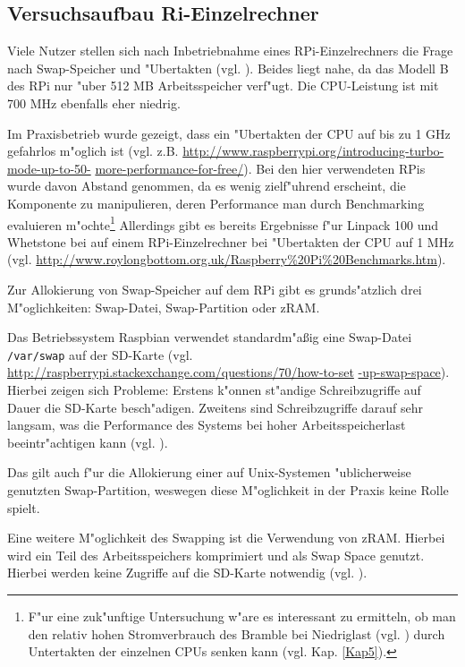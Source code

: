 \subsection{Versuchsaufbau Ri-Einzelrechner}\label{RPi-Versuchsaufbau}

Viele Nutzer stellen sich nach Inbetriebnahme eines RPi-Einzelrechners die Frage nach Swap-Speicher und "Ubertakten (vgl. \cite{pow12}). Beides liegt nahe, da das Modell B des RPi nur "uber 512 MB Arbeitsspeicher verf"ugt. Die CPU-Leistung ist mit 700 MHz ebenfalls eher niedrig. 

Im Praxisbetrieb wurde gezeigt, dass ein "Ubertakten der CPU auf bis zu 1 GHz gefahrlos m"oglich ist (vgl. z.B. \url{http://www.raspberrypi.org/introducing-turbo-mode-up-to-50-} \url{more-performance-for-free/}). Bei den hier verwendeten RPis wurde davon Abstand genommen, da es wenig zielf"uhrend erscheint, die Komponente zu manipulieren, deren Performance man durch Benchmarking evaluieren m"ochte\footnote{F"ur eine zuk"unftige Untersuchung w"are es interessant zu ermitteln, ob man den relativ hohen Stromverbrauch des Bramble bei Niedriglast (vgl. \cite{kli13}) durch Untertakten der einzelnen CPUs senken kann (vgl. Kap. \ref{Kap5}).} Allerdings gibt es bereits Ergebnisse f"ur Linpack 100 und Whetstone bei auf einem RPi-Einzelrechner bei "Ubertakten der CPU auf 1 MHz (vgl. \url{http://www.roylongbottom.org.uk/Raspberry\%20Pi\%20Benchmarks.htm}).

Zur Allokierung von Swap-Speicher auf dem RPi gibt es grunds"atzlich drei M"oglichkeiten: Swap-Datei, Swap-Partition oder zRAM. 

Das Betriebssystem Raspbian verwendet standardm"a\ss ig eine Swap-Datei \texttt{/var/swap} auf der SD-Karte (vgl. \url{http://raspberrypi.stackexchange.com/questions/70/how-to-set} \url{-up-swap-space}). Hierbei zeigen sich Probleme: Erstens k"onnen st"andige Schreibzugriffe auf Dauer die SD-Karte besch"adigen. Zweitens sind Schreibzugriffe darauf sehr langsam, was die Performance des Systems bei hoher Arbeitsspeicherlast beeintr"achtigen kann (vgl. \cite{pow12}). 

Das gilt auch f"ur die Allokierung einer auf Unix-Systemen "ublicherweise genutzten Swap-Partition, weswegen diese M"oglichkeit in der Praxis keine Rolle spielt. 

Eine weitere M"oglichkeit des Swapping ist die Verwendung von zRAM. Hierbei wird ein Teil des Arbeitsspeichers komprimiert und als Swap Space genutzt. Hierbei werden keine Zugriffe auf die SD-Karte notwendig (vgl. \cite{pow12}). 

